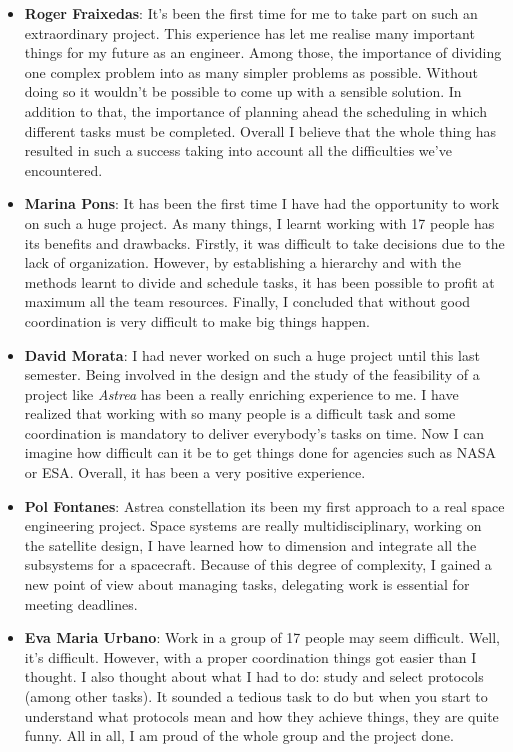 {\begin{itemize}
 
\item \textbf{Roger Fraixedas}: It's been the first time for me to take part on such an extraordinary project. This experience has let me realise many important things for my future as an engineer. Among those, the importance of dividing one complex problem into as many simpler problems as possible. Without doing so it wouldn't be possible to come up with a sensible solution. In addition to that, the importance of planning ahead the scheduling in which different tasks must be completed. Overall I believe that the whole thing has resulted in such a success taking into account all the difficulties we've encountered.

 
\item \textbf{Marina Pons}: It has been the first time I have had the opportunity to work on such a huge project. As many things, I learnt working with 17 people has its benefits and drawbacks. Firstly, it was difficult to take decisions due to the lack of organization. However, by establishing a hierarchy and with the methods learnt to divide and schedule tasks, it has been possible to profit at maximum all the team resources. Finally, I concluded that without good coordination is very difficult to make big things happen.

 
\item \textbf{David Morata}: I had never worked on such a huge project until this last semester. Being involved in the design and the study of the feasibility of a project like \textit{Astrea} has been a really enriching experience to me. I have realized that working with so many people is a difficult task and some coordination is mandatory to deliver everybody's tasks on time. Now I can imagine how difficult can it be to get things done for agencies such as NASA or ESA. Overall, it has been a very positive experience. 

 
\item \textbf{Pol Fontanes}: Astrea constellation  its been my first approach to a real space engineering project. Space systems are really multidisciplinary, working on the satellite design, I have learned how to dimension and integrate all the subsystems for a spacecraft. Because of this degree of complexity, I gained a new point of view about managing tasks, delegating work is essential for meeting deadlines.

 
\item \textbf{Eva Maria Urbano}: Work in a group of 17 people may seem difficult. Well, it's difficult. However, with a proper coordination things got easier than I thought. I also thought about what I had to do: study and select protocols (among other tasks). It sounded a tedious task to do but when you start to understand what protocols mean and how they achieve things, they are quite funny. All in all, I am proud of the whole group and the project done.


\end{itemize}}
